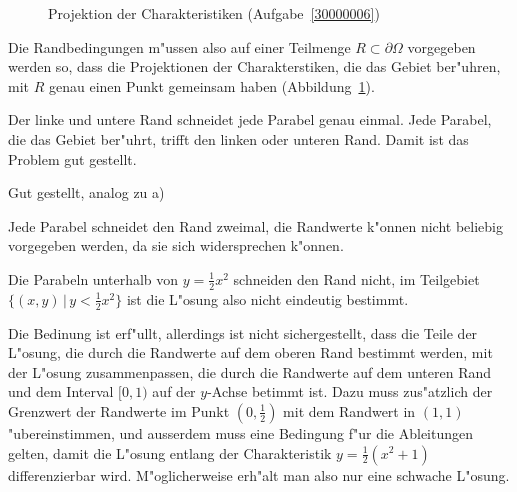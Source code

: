 \begin{loesung}
\begin{figure}
\begin{center}
\end{center}
\caption{Projektion der Charakteristiken (Aufgabe~\ref{30000006})
\label{30000006:char}}
\end{figure}
Die Randbedingungen m"ussen also auf einer Teilmenge $R\subset \partial\Omega$
vorgegeben werden so, dass die Projektionen der Charakterstiken, die das
Gebiet ber"uhren, mit $R$ genau einen Punkt gemeinsam haben (Abbildung~\ref{30000006:char}). 
\begin{teilaufgaben}
\item Der linke und untere Rand schneidet jede Parabel genau einmal. 
Jede Parabel, die das Gebiet ber"uhrt, trifft den linken oder unteren
Rand. Damit ist das Problem gut gestellt.
\item Gut gestellt, analog zu a)
\item Jede Parabel schneidet den Rand zweimal, die Randwerte k"onnen nicht
beliebig vorgegeben werden, da sie sich widersprechen k"onnen.
\item Die Parabeln unterhalb von $y=\frac12x^2$ schneiden den Rand
nicht, im Teilgebiet $\{(x,y)\,|\, y<\frac12x^2\}$ ist die L"osung also
nicht eindeutig bestimmt.
\item Die Bedinung ist erf"ullt, allerdings ist nicht sichergestellt,
dass die Teile der L"osung, die durch die Randwerte auf dem oberen 
Rand bestimmt werden, mit der L"osung zusammenpassen, die durch
die Randwerte auf dem unteren Rand und dem Interval $[0,1)$ auf
der $y$-Achse betimmt ist. Dazu muss zus"atzlich der Grenzwert
der Randwerte im Punkt $(0,\frac12)$ mit dem Randwert in $(1,1)$
"ubereinstimmen, und ausserdem muss eine Bedingung f"ur die Ableitungen
gelten, damit die L"osung entlang der Charakteristik $y=\frac12(x^2+1)$
differenzierbar wird. M"oglicherweise erh"alt man also nur eine
schwache L"osung.
\qedhere
\end{teilaufgaben}
\end{loesung}
